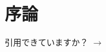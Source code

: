 \documentclass[./main]{subfiles}
\begin{document}
\section{序論}
引用できていますか？ $\to$ \citet{Haxby2425}

\end{document}
